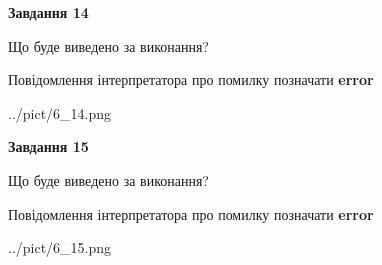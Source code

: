 \documentclass[11pt, ukrainian]{article}
\begin{document}
{\begin {large}
{\begin {center}\textbf{Завдання 14}\end {center}}\par
Що буде виведено за виконання? \par
Повідомлення інтерпретатора про помилку позначати \textbf{error}

\begin{center}
	{../pict/6_14.png}
\end{center}
\newpage

{\begin {center}\textbf{Завдання 15}\end {center}}\par
Що буде виведено за виконання? \par
Повідомлення інтерпретатора про помилку позначати \textbf{error}

\begin{center}
	{../pict/6_15.png}
\end{center}
\newpage

\end {large}}
\end{document}
